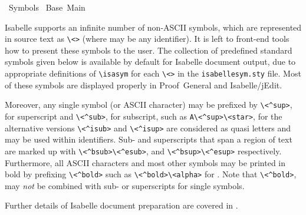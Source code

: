 %
\begin{isabellebody}%
\def\isabellecontext{Symbols}%
%
\isadelimtheory
%
\endisadelimtheory
%
\isatagtheory
{}\isamarkupfalse%
\ Symbols\isanewline
{}\ Base\ Main\isanewline
{}%
\endisatagtheory
{\isafoldtheory}%
%
\isadelimtheory
%
\endisadelimtheory
%
\isamarkuptrue%
%
\begin{isamarkuptext}%
Isabelle supports an infinite number of non-ASCII symbols, which are
  represented in source text as \verb|\|\verb|<|\verb|>| (where  may be any identifier).  It
  is left to front-end tools how to present these symbols to the user.
  The collection of predefined standard symbols given below is
  available by default for Isabelle document output, due to
  appropriate definitions of \verb|\|\verb|isasym| for each \verb|\|\verb|<|\verb|>| in the \verb|isabellesym.sty| file.  Most of these symbols
  are displayed properly in Proof~General and Isabelle/jEdit.

  Moreover, any single symbol (or ASCII character) may be prefixed by
  \verb|\|\verb|<^sup>|, for superscript and \verb|\|\verb|<^sub>|, for subscript, such as \verb|A\|\verb|<^sup>\<star>|, for  the alternative
  versions \verb|\|\verb|<^isub>| and \verb|\|\verb|<^isup>| are considered as quasi letters and may
  be used within identifiers.  Sub- and superscripts that span a
  region of text are marked up with \verb|\|\verb|<^bsub>|\verb|\|\verb|<^esub>|, and
  \verb|\|\verb|<^bsup>|\verb|\|\verb|<^esup>| respectively.  Furthermore, all ASCII
  characters and most other symbols may be printed in bold by
  prefixing \verb|\|\verb|<^bold>| such as \verb|\|\verb|<^bold>\|\verb|<alpha>| for .  Note that \verb|\|\verb|<^bold>|, may
  \emph{not} be combined with sub- or superscripts for single symbols.

  Further details of Isabelle document preparation are covered in
  .

  \begin{center}
  \begin{isabellebody}
    
  \end{isabellebody}
  \end{center}%
\end{isamarkuptext}%
\isamarkuptrue%
%
\isadelimtheory
%
\endisadelimtheory
%
\isatagtheory
{}\isamarkupfalse%
%
\endisatagtheory
{\isafoldtheory}%
%
\isadelimtheory
%
\endisadelimtheory
\end{isabellebody}%
